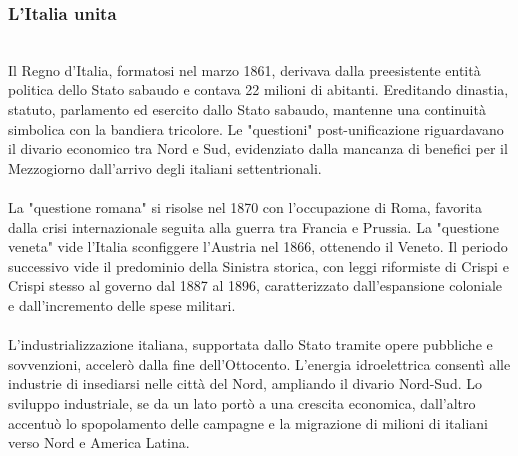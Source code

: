 \documentclass{report}
\begin{document}
\subsubsection{L'Italia unita}
\\
Il Regno d'Italia, formatosi nel marzo 1861, derivava dalla preesistente entità politica dello Stato sabaudo e contava 22 milioni di abitanti. Ereditando dinastia, statuto, parlamento ed esercito dallo Stato sabaudo, mantenne una continuità simbolica con la bandiera tricolore. Le "questioni" post-unificazione riguardavano il divario economico tra Nord e Sud, evidenziato dalla mancanza di benefici per il Mezzogiorno dall'arrivo degli italiani settentrionali.
\\
\\
La "questione romana" si risolse nel 1870 con l'occupazione di Roma, favorita dalla crisi internazionale seguita alla guerra tra Francia e Prussia. La "questione veneta" vide l'Italia sconfiggere l'Austria nel 1866, ottenendo il Veneto. Il periodo successivo vide il predominio della Sinistra storica, con leggi riformiste di Crispi e Crispi stesso al governo dal 1887 al 1896, caratterizzato dall'espansione coloniale e dall'incremento delle spese militari.
\\
\\
L'industrializzazione italiana, supportata dallo Stato tramite opere pubbliche e sovvenzioni, accelerò dalla fine dell'Ottocento. L'energia idroelettrica consentì alle industrie di insediarsi nelle città del Nord, ampliando il divario Nord-Sud. Lo sviluppo industriale, se da un lato portò a una crescita economica, dall'altro accentuò lo spopolamento delle campagne e la migrazione di milioni di italiani verso Nord e America Latina.
\\
\end{document}
